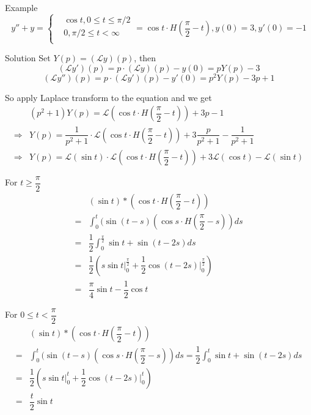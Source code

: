 \documentclass{beamer}
\begin{document}
\begin{frame}
\begin{block}{Example}
$$y''+y=\left\{
\begin{aligned}
&\cos t,0\leqslant t\leqslant\pi/2\\
&0,\pi/2\leqslant t<\infty\\
\end{aligned}
\right.=\cos t\cdot H(\dfrac{\pi}{2}-t),y(0)=3,y'(0)=-1$$
\end{block}
\end{frame}

\begin{frame}
\begin{block}{Solution}
Set $Y(p)=(\mathcal{L}y)(p)$, then
$$(\mathcal{L}y')(p)=p\cdot(\mathcal{L}y)(p)-y(0)=pY(p)-3 $$
$$(\mathcal{L}y'')(p)=p\cdot(\mathcal{L}y')(p)-y'(0)=p^2Y(p)-3p+1 $$

So apply Laplace transform to the equation and we get
\begin{align*}
&(p^2+1)Y(p)=\mathcal{L}(\cos t\cdot H(\dfrac{\pi}{2}-t))+3p-1\\
\Rightarrow& Y(p)=\dfrac{1}{p^2+1}\cdot \mathcal{L}(\cos t\cdot H(\dfrac{\pi}{2}-t))+3\dfrac{p}{p^2+1}-\dfrac{1}{p^2+1}\\
\Rightarrow& Y(p)=\mathcal{L}(\sin t)\cdot\mathcal{L}(\cos t\cdot H(\dfrac{\pi}{2}-t))+3\mathcal{L}(\cos t)-\mathcal{L}(\sin t)
\end{align*}
\end{block}
\end{frame}


\begin{frame}
\begin{block}{}
For $t\geqslant\dfrac{\pi}{2}$
\begin{align*}
&(\sin t)*(\cos t\cdot H(\dfrac{\pi}{2}-t))\\
=&\int_0^t (\sin (t-s)(\cos s\cdot H(\dfrac{\pi}{2}-s))ds \\
=&\dfrac{1}{2}\int_0^{\frac{\pi}{2}} \sin t+\sin(t-2s) ds\\
=&\dfrac{1}{2} (s\sin t\big|_0^{\frac{\pi}{2}}+\dfrac{1}{2}\cos(t-2s)\big|_0^{\frac{\pi}{2}})\\
=&\dfrac{\pi}{4}\sin t-\dfrac{1}{2}\cos t
\end{align*}
\end{block}
\end{frame}

\begin{frame}
\begin{block}{}
For $0\leqslant t<\dfrac{\pi}{2}$
\begin{align*}
&(\sin t)*(\cos t\cdot H(\dfrac{\pi}{2}-t))\\
=&\int_0^t (\sin (t-s)(\cos s\cdot H(\dfrac{\pi}{2}-s))ds =\dfrac{1}{2}\int_0^{t} \sin t+\sin(t-2s) ds\\
=&\dfrac{1}{2} (s\sin t\big|_0^{t}+\dfrac{1}{2}\cos(t-2s)\big|_0^{t})\\
=&\dfrac{t}{2}\sin t
\end{align*}
\end{block}
\end{frame}
\end{document}
